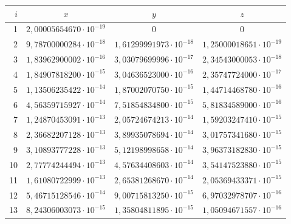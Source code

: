 \begin{table}[p!]
\begin{tabular}{r|c|c|c}
\hline	
\footnotesize $i$ & \footnotesize 	$x$	&\footnotesize 	$y$	&\footnotesize 	$z$	\\
\hline
\rule{0mm}{12pt}%
1	&$	2,00005654670\cdot 10^{-19}	$&$	0	$&$	0	$\\
2	&$	9,78700000284\cdot 10^{-18}	$&$	1,61299991973\cdot 10^{-18}	$&$	1,25000018651\cdot 10^{-19}	 $\\
3	&$	1,83962900002\cdot 10^{-16}	$&$	3,03079699996\cdot 10^{-17}	$&$	2,34543000053\cdot 10^{-18}	 $\\
4	&$	1,84907818200\cdot 10^{-15}	$&$	3,04636523000\cdot 10^{-16}	$&$	2,35747724000\cdot 10^{-17}	 $\\
5	&$	1,13506235422\cdot 10^{-14}	$&$	1,87002070750\cdot 10^{-15}	$&$	1,44714468780\cdot 10^{-16}	 $\\
6	&$	4,56359715927\cdot 10^{-14}	$&$	7,51854834800\cdot 10^{-15}	$&$	5,81834589000\cdot 10^{-16}	 $\\
7	&$	1,24870453091\cdot 10^{-13}	$&$	2,05724674213\cdot 10^{-14}	$&$	1,59203247410\cdot 10^{-15}	 $\\
8	&$	2,36682207128\cdot 10^{-13}	$&$	3,89935078694\cdot 10^{-14}	$&$	3,01757341680\cdot 10^{-15}	 $\\
9	&$	3,10893777228\cdot 10^{-13}	$&$	5,12198998658\cdot 10^{-14}	$&$	3,96373182830\cdot 10^{-15}	 $\\
10	&$	2,77774244494\cdot 10^{-13}	$&$	4,57634408603\cdot 10^{-14}	$&$	3,54147523880\cdot 10^{-15}	$\\
11	&$	1,61080722999\cdot 10^{-13}	$&$	2,65381268670\cdot 10^{-14}	$&$	2,05369433371\cdot 10^{-15}	$\\
12	&$	5,46715128546\cdot 10^{-14}	$&$	9,00715813250\cdot 10^{-15}	$&$	6,97032978707\cdot 10^{-16}	$\\
13	&$	8,24306003073\cdot 10^{-15}	$&$	1,35804811895\cdot 10^{-15}	$&$	1,05094671557\cdot 10^{-16}	$\\
\hline
\end{tabular}
\end{table}


